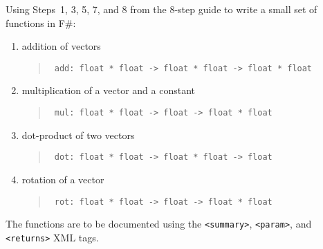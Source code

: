 Using Steps~1, 3, 5, 7, and 8 from the 8-step guide to write a small set of functions in F\#:
\begin{enumerate}
\item addition of vectors
  \begin{quote}
    \mbox{\lstinline! add: float * float -> float * float -> float * float!}
  \end{quote}
\item multiplication of a vector and a constant
  \begin{quote}
    \mbox{\lstinline! mul: float * float -> float -> float * float!}
  \end{quote}
\item dot-product of two vectors
  \begin{quote}
    \mbox{\lstinline! dot: float * float -> float * float -> float!}
  \end{quote}
\item rotation of a vector
  \begin{quote}
    \mbox{\lstinline! rot: float * float -> float -> float * float!}
  \end{quote}
\end{enumerate}
The functions are to be documented using the \verb|<summary>|, \verb|<param>|, and \verb|<returns>| XML tags.
